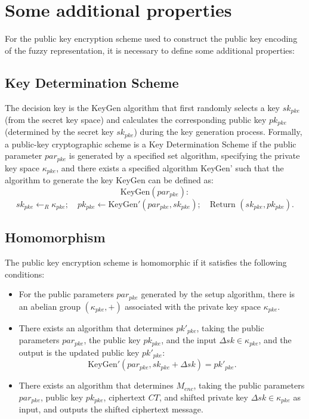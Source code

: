 \documentclass[graybox]{svmult}
\begin{document}
\section{Some additional properties}
For the public key encryption scheme used to construct the public key encoding of the fuzzy representation, it is necessary to define some additional properties:

\subsection{Key Determination Scheme}

The decision key is the KeyGen algorithm that first randomly selects a key $sk_{pke}$ (from the secret key space) and calculates the corresponding public key $pk_{pke}$ (determined by the secret key $sk_{pke}$) during the key generation process. Formally, a public-key cryptographic scheme is a Key Determination Scheme if the public parameter $par_{pke}$ is generated by a specified set algorithm, specifying the private key space $\kappa_{pke}$, and there exists a specified algorithm KeyGen' such that the algorithm to generate the key KeyGen can be defined as:
\[
    \text{KeyGen}(par_{pke}):
\]
\[
    sk_{pke} \leftarrow_R \kappa_{pke}; \quad pk_{pke} \leftarrow \text{KeyGen}'(par_{pke}, sk_{pke}); \quad \text{Return } (sk_{pke}, pk_{pke}).
\]

\subsection{Homomorphism}

The public key encryption scheme is homomorphic if it satisfies the following conditions:
\begin{itemize}
    \item For the public parameters $par_{pke}$ generated by the setup algorithm, there is an abelian group $(\kappa_{pke}, +)$ associated with the private key space $\kappa_{pke}$.
    \item There exists an algorithm that determines $pk'_{pke}$, taking the public parameters $par_{pke}$, the public key $pk_{pke}$, and the input $\Delta sk \in \kappa_{pke}$, and the output is the updated public key $pk'_{pke}$:
          \[
              \text{KeyGen}'(par_{pke}, sk_{pke} + \Delta sk) = pk'_{pke}.
          \]
    \item There exists an algorithm that determines $M_{enc}$, taking the public parameters $par_{pke}$, public key $pk_{pke}$, ciphertext $CT$, and shifted private key $\Delta sk \in \kappa_{pke}$ as input, and outputs the shifted ciphertext message.
\end{itemize}
\end{document}
